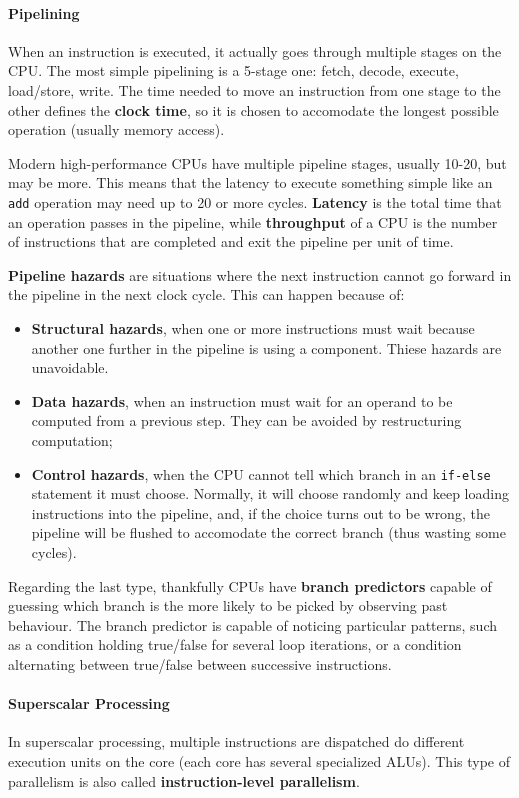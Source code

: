 \paragraph{Pipelining}
When an instruction is executed, it actually goes through multiple stages on the CPU. The most simple pipelining is a 5-stage one: fetch, decode, execute, load/store, write. The time needed to move an instruction from one stage to the other defines the \textbf{clock time}, so it is chosen to accomodate the longest possible operation (usually memory access). 

Modern high-performance CPUs have multiple pipeline stages, usually 10-20, but may be more. This means that the latency to execute something simple like an \texttt{add} operation may need up to 20 or more cycles. \textbf{Latency} is the total time that an operation passes in the pipeline, while \textbf{throughput} of a CPU is the number of instructions that are completed and exit the pipeline per unit of time.

\textbf{Pipeline hazards} are situations where the next instruction cannot go forward in the pipeline in the next clock cycle. This can happen because of:
\begin{itemize}
    \item \textbf{Structural hazards}, when one or more instructions must wait because another one further in the pipeline is using a component. Thiese hazards are unavoidable.
    \item \textbf{Data hazards}, when an instruction must wait for an operand to be computed from a previous step. They can be avoided by restructuring computation;
    \item \textbf{Control hazards}, when the CPU cannot tell which branch in an \texttt{if-else} statement it must choose. Normally, it will choose randomly and keep loading instructions into the pipeline, and, if the choice turns out to be wrong, the pipeline will be flushed to accomodate the correct branch (thus wasting some cycles).
\end{itemize}
Regarding the last type, thankfully CPUs have \textbf{branch predictors} capable of guessing which branch is the more likely to be picked by observing past behaviour. The branch predictor is capable of noticing particular patterns, such as a condition holding true/false for several loop iterations, or a condition alternating between true/false between successive instructions.

\paragraph{Superscalar Processing}
In superscalar processing, multiple instructions are dispatched do different execution units on the core (each core has several specialized ALUs). This type of parallelism is also called \textbf{instruction-level parallelism}.


